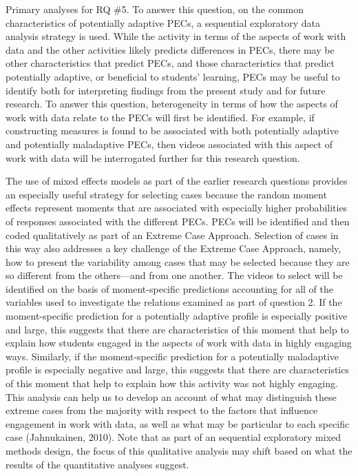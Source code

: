 \documentclass[]{book}
\theoremstyle{definition}
\theoremstyle{definition}
\theoremstyle{definition}
\theoremstyle{remark}
\begin{document}
Primary analyses for RQ \#5. To answer this question, on the common
characteristics of potentially adaptive PECs, a sequential exploratory
data analysis strategy is used. While the activity in terms of the
aspects of work with data and the other activities likely predicts
differences in PECs, there may be other characteristics that predict
PECs, and those characteristics that predict potentially adaptive, or
beneficial to students' learning, PECs may be useful to identify both
for interpreting findings from the present study and for future
research. To answer this question, heterogeneity in terms of how the
aspects of work with data relate to the PECs will first be identified.
For example, if constructing measures is found to be associated with
both potentially adaptive and potentially maladaptive PECs, then videos
associated with this aspect of work with data will be interrogated
further for this research question.

The use of mixed effects models as part of the earlier research
questions provides an especially useful strategy for selecting cases
because the random moment effects represent moments that are associated
with especially higher probabilities of responses associated with the
different PECs. PECs will be identified and then coded qualitatively as
part of an Extreme Case Approach. Selection of cases in this way also
addresses a key challenge of the Extreme Case Approach, namely, how to
present the variability among cases that may be selected because they
are so different from the others---and from one another. The videos to
select will be identified on the basis of moment-specific predictions
accounting for all of the variables used to investigate the relations
examined as part of question 2. If the moment-specific prediction for a
potentially adaptive profile is especially positive and large, this
suggests that there are characteristics of this moment that help to
explain how students engaged in the aspects of work with data in highly
engaging ways. Similarly, if the moment-specific prediction for a
potentially maladaptive profile is especially negative and large, this
suggests that there are characteristics of this moment that help to
explain how this activity was not highly engaging. This analysis can
help us to develop an account of what may distinguish these extreme
cases from the majority with respect to the factors that influence
engagement in work with data, as well as what may be particular to each
specific case (Jahnukainen, 2010). Note that as part of an sequential
exploratory mixed methods design, the focus of this qualitative analysis
may shift based on what the results of the quantitative analyses
suggest.
\end{document}

